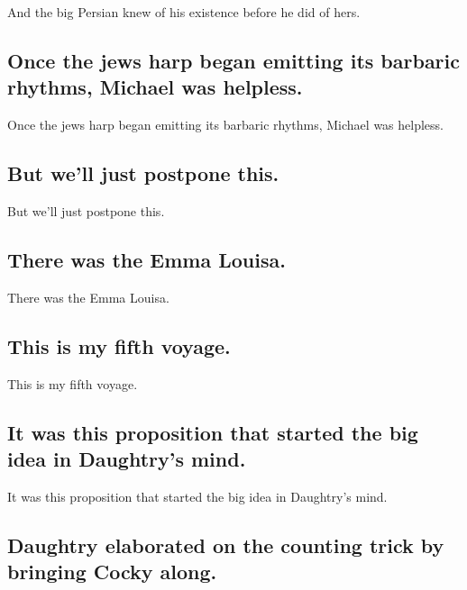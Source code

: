\documentclass[]{article}
\begin{document}
And the big Persian knew of his existence before he did of hers.

\hypertarget{once-the-jews-harp-began-emitting-its-barbaric-rhythms-michael-was-helpless.}{%
\subsection{Once the jews harp began emitting its barbaric rhythms,
Michael was
helpless.}\label{once-the-jews-harp-began-emitting-its-barbaric-rhythms-michael-was-helpless.}}

Once the jews harp began emitting its barbaric rhythms, Michael was
helpless.

\hypertarget{but-well-just-postpone-this.}{%
\subsection{But we'll just postpone
this.}\label{but-well-just-postpone-this.}}

But we'll just postpone this.

\hypertarget{there-was-the-emma-louisa.}{%
\subsection{There was the Emma
Louisa.}\label{there-was-the-emma-louisa.}}

There was the Emma Louisa.

\hypertarget{this-is-my-fifth-voyage.}{%
\subsection{This is my fifth voyage.}\label{this-is-my-fifth-voyage.}}

This is my fifth voyage.

\hypertarget{it-was-this-proposition-that-started-the-big-idea-in-daughtrys-mind.}{%
\subsection{It was this proposition that started the big idea in
Daughtry's
mind.}\label{it-was-this-proposition-that-started-the-big-idea-in-daughtrys-mind.}}

It was this proposition that started the big idea in Daughtry's mind.

\hypertarget{daughtry-elaborated-on-the-counting-trick-by-bringing-cocky-along.}{%
\subsection{Daughtry elaborated on the counting trick by bringing Cocky
along.}\label{daughtry-elaborated-on-the-counting-trick-by-bringing-cocky-along.}}
\end{document}

